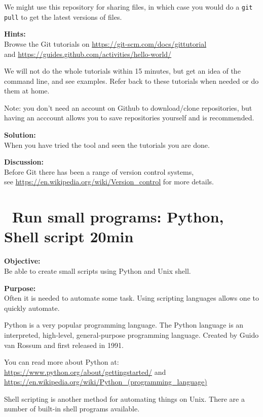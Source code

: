\documentclass[a4paper,11pt,notitlepage]{report}
\begin{document}
We might use this repository for sharing files, in which case you would do a \verb+git pull+ to get the latest versions of files.

{\bf Hints:}\\
Browse the Git tutorials on \url{https://git-scm.com/docs/gittutorial}\\
and \url{https://guides.github.com/activities/hello-world/}

We will not do the whole tutorials within 15 minutes, but get an idea of the command line, and see examples. Refer back to these tutorials when needed or do them at home.

Note: you don't need an account on Github to download/clone repositories, but having an acccount allows you to save repositories yourself and is recommended.

{\bf Solution:}\\
When you have tried the tool and seen the tutorials you are done.

{\bf Discussion:}\\
Before Git there has been a range of version control systems,\\
see \url{https://en.wikipedia.org/wiki/Version\_control} for more details.



\chapter{\faInfoCircle\  Run small programs: Python, Shell script 20min}
\label{ex:small-python}

{\bf Objective:}\\
Be able to create small scripts using Python and Unix shell.

{\bf Purpose:}\\
Often it is needed to automate some task. Using scripting languages allows one to quickly automate.

Python is a very popular programming language. The Python language
is an interpreted, high-level, general-purpose programming language. Created by Guido van Rossum and first released in 1991.


You can read more about Python at:\\
\url{https://www.python.org/about/gettingstarted/} and \\
\url{https://en.wikipedia.org/wiki/Python_(programming_language)}

Shell scripting is another method for automating things on Unix. There are a number of built-in shell programs available.
\end{document}
